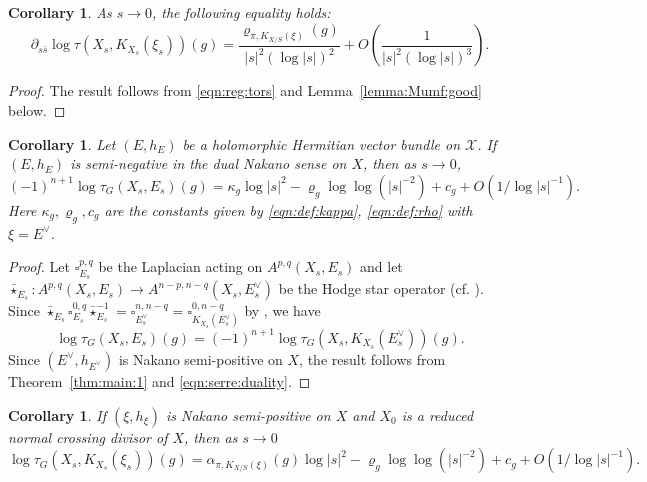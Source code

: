 \documentclass[amscd, leqno]{amsart}
\theoremstyle{plain}
\newtheorem{corollary}[theorem]{Corollary}
\theoremstyle{definition}
\theoremstyle{remark}
\newenvironment{pf}{\begin{proof}}{\end{proof}}
\begin{document}
\begin{corollary}
\label{cor:HessianTorsion}
As $s\to0$, the following equality holds:
$$
\partial_{s\bar{s}}\log\tau(X_{s}, K_{X_{s}}(\xi_{s}))(g) 
= \frac{\varrho_{\pi,K_{X/S}(\xi)}(g)}{|s|^{2}(\log|s|)^{2}} + O\left(\frac{1}{|s|^{2}(\log|s|)^{3}}\right).
$$
\end{corollary}

\begin{pf}
The result follows from \eqref{eqn:reg:tors} and Lemma~\ref{lemma:Mumf:good} below.
\end{pf}


\begin{corollary}
\label{cor:Nk:neg}
Let $(E,h_{E})$ be a holomorphic Hermitian vector bundle on ${\mathcal X}$. 
If $(E,h_{E})$ is semi-negative in the dual Nakano sense on $X$, then as $s\to0$,
$$
(-1)^{n+1}\log\tau_{G}(X_{s},E_{s})(g) = \kappa_{g} \log|s|^{2} - \varrho_{g} \log\log (|s|^{-2}) + c_{g} + O\left( 1/\log |s|^{-1} \right).
$$
Here $\kappa_{g},\varrho_{g},c_{g}$ are the constants given by \eqref{eqn:def:kappa}, \eqref{eqn:def:rho} with $\xi=E^{\lor}$.
\end{corollary}

\begin{pf}
Let $\square_{E_{s}}^{p,q}$ be the Laplacian acting on $A^{p,q}(X_{s},E_{s})$ and let 
$\bar{\star}_{E_{s}} \colon A^{p,q}(X_{s}, E_{s}) \to A^{n-p,n-q}(X_{s}, E_{s}^{\lor})$ be the Hodge star operator (cf. \cite[p.166]{Wells08}). 
Since 
$\bar{\star}_{E_{s}}\square_{E_{s}}^{0,q}\bar{\star}_{E_{s}}^{-1} = \square_{E_{s}^{\lor}}^{n,n-q} = \square_{K_{X_{s}}(E_{s}^{\lor})}^{0,n-q}$
by \cite[Chap.\,V Prop.\,2.4 (b)]{Wells08}, we have
\begin{equation}
\label{eqn:serre:duality}
\log\tau_{G}(X_{s},E_{s})(g) = (-1)^{n+1}\log\tau_{G}(X_{s}, K_{X_{s}}(E_{s}^{\lor}))(g).
\end{equation}
Since $(E^{\lor},h_{E^{\lor}})$ is Nakano semi-positive on $X$, the result follows from Theorem~\ref{thm:main:1} and \eqref{eqn:serre:duality}.
\end{pf}


\begin{corollary}
\label{cor:ss:degn}
If $(\xi,h_{\xi})$ is Nakano semi-positive on $X$ and $X_{0}$ is a reduced normal crossing divisor of $X$, then as $s\to0$
$$
\log\tau_{G}(X_{s}, K_{X_{s}}(\xi_{s}))(g) 
= \alpha_{\pi, K_{X/S}(\xi)}(g) \log|s|^{2} - \varrho_{g} \log\log (|s|^{-2}) + c_{g} + O\left(1/\log |s|^{-1} \right).
$$
\end{corollary}
\end{document}
